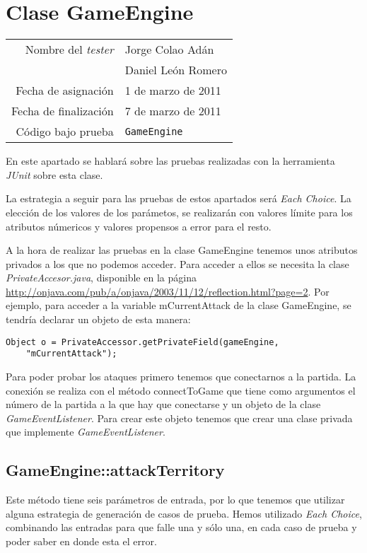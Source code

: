 \section{Clase GameEngine}

{\small
\begin{tabular}{r|l}
Nombre del \textit{tester} & Jorge Colao Adán \\
& Daniel León Romero\\
Fecha de asignación & 1 de marzo de 2011 \\
Fecha de finalización & 7 de marzo de 2011 \\
Código bajo prueba & \texttt{GameEngine}
\end{tabular}
}

En este apartado se hablará sobre las pruebas realizadas con la herramienta \textit{JUnit} sobre esta clase.

La estrategia a seguir para las pruebas de estos apartados será \textit{Each Choice}. La elección de los valores de los parámetos, se realizarán con valores límite para los atributos númericos y valores propensos a error para el resto.

A la hora de realizar las pruebas en la clase GameEngine tenemos unos atributos privados a los que no podemos acceder. Para acceder a ellos se necesita la clase \textit{PrivateAccesor.java}, disponible en la página \url{http://onjava.com/pub/a/onjava/2003/11/12/reflection.html?page=2}. Por ejemplo, para acceder a la variable mCurrentAttack de la clase GameEngine, se tendría declarar un objeto de esta manera:
\begin{verbatim}
Object o = PrivateAccessor.getPrivateField(gameEngine, 
	"mCurrentAttack");
\end{verbatim}

Para poder probar los ataques primero tenemos que conectarnos a la partida. La conexión se realiza con el método connectToGame que tiene como argumentos el número de la partida a la que hay que conectarse y un objeto de la clase \textit{GameEventListener}. Para crear este objeto tenemos que crear una clase privada que implemente \textit{GameEventListener}.

\subsection{GameEngine::attackTerritory}

Este método tiene seis parámetros de entrada, por lo que tenemos que utilizar alguna estrategia de generación de casos de prueba. Hemos utilizado \textit{Each Choice}, combinando las entradas para que falle una y sólo una, en cada caso de prueba y poder saber en donde esta el error.

